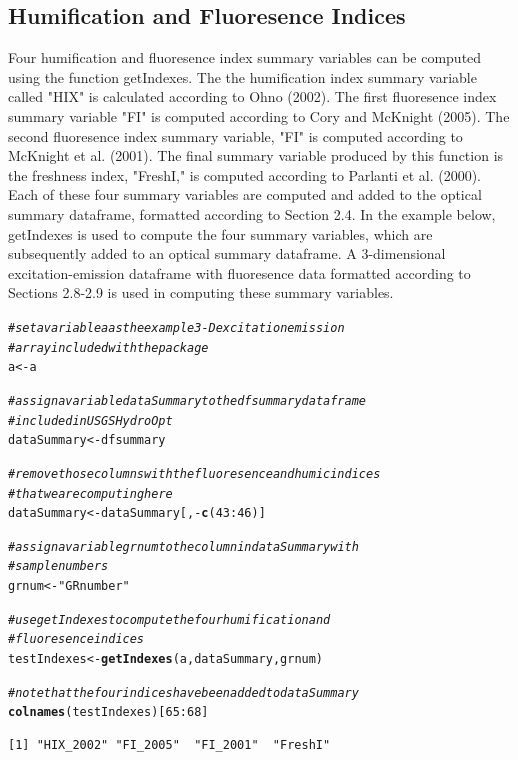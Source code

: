 \documentclass[a4paper,11pt]{article}\usepackage[]{graphicx}\usepackage[]{color}
\makeatletter
\newcommand{\hlnum}[1]{\textcolor[rgb]{0.686,0.059,0.569}{#1}}%
\newcommand{\hlstr}[1]{\textcolor[rgb]{0.192,0.494,0.8}{#1}}%
\newcommand{\hlcom}[1]{\textcolor[rgb]{0.678,0.584,0.686}{\textit{#1}}}%
\newcommand{\hlopt}[1]{\textcolor[rgb]{0,0,0}{#1}}%
\newcommand{\hlstd}[1]{\textcolor[rgb]{0.345,0.345,0.345}{#1}}%
\newcommand{\hlkwb}[1]{\textcolor[rgb]{0.69,0.353,0.396}{#1}}%
\newcommand{\hlkwd}[1]{\textcolor[rgb]{0.737,0.353,0.396}{\textbf{#1}}}%
\newenvironment{kframe}{%
 \def\at@end@of@kframe{}%
 \ifinner\ifhmode%
  \def\at@end@of@kframe{\end{minipage}}%
  \begin{minipage}{\columnwidth}%
 \fi\fi%
 \def\FrameCommand##1{\hskip\@totalleftmargin \hskip-\fboxsep
 \colorbox{shadecolor}{##1}\hskip-\fboxsep
     \hskip-\linewidth \hskip-\@totalleftmargin \hskip\columnwidth}%
 \MakeFramed {\advance\hsize-\width
   \@totalleftmargin\z@ \linewidth\hsize
   \@setminipage}}%
 {\par\unskip\endMakeFramed%
 \at@end@of@kframe}
\newenvironment{knitrout}{}{} %
\makeatother
\begin{document}
\subsection{Humification and Fluoresence Indices}
Four humification and fluoresence index summary variables can be computed using the function getIndexes. The the humification index summary variable called "HIX" is calculated according to Ohno (2002). The first fluoresence index summary variable "FI" is computed according to Cory and McKnight (2005). The second fluoresence index summary variable, "FI" is computed according to McKnight et al. (2001). The final summary variable produced by this function is the freshness index, "FreshI," is computed according to Parlanti et al. (2000). Each of these four summary variables are computed and added to the optical summary dataframe, formatted according to Section 2.4. In the example below, getIndexes is used to compute the four summary variables, which are subsequently added to an optical summary dataframe. A 3-dimensional excitation-emission dataframe with fluoresence data formatted according to Sections 2.8-2.9 is used in computing these summary variables.

\begin{knitrout}
\color{fgcolor}\begin{kframe}
\begin{alltt}
\hlcom{# set a variable a as the example 3-D excitation emission}
\hlcom{# array included with the package}
\hlstd{a} \hlkwb{<-} \hlstd{a}

\hlcom{# assign a variable dataSummary to the dfsummary dataframe}
\hlcom{# included in USGSHydroOpt}
\hlstd{dataSummary} \hlkwb{<-} \hlstd{dfsummary}

\hlcom{# remove those columns with the fluoresence and humic indices}
\hlcom{# that we are computing here}
\hlstd{dataSummary} \hlkwb{<-} \hlstd{dataSummary[,} \hlopt{-}\hlkwd{c}\hlstd{(}\hlnum{43}\hlopt{:}\hlnum{46}\hlstd{)]}

\hlcom{# assign a variable grnum to the column in dataSummary with}
\hlcom{# sample numbers}
\hlstd{grnum} \hlkwb{<-} \hlstr{"GRnumber"}

\hlcom{# use getIndexes to compute the four humification and}
\hlcom{# fluoresence indices}
\hlstd{testIndexes} \hlkwb{<-} \hlkwd{getIndexes}\hlstd{(a, dataSummary, grnum)}

\hlcom{# note that the four indices have been added to dataSummary}
\hlkwd{colnames}\hlstd{(testIndexes)[}\hlnum{65}\hlopt{:}\hlnum{68}\hlstd{]}
\end{alltt}
\begin{verbatim}
[1] "HIX_2002" "FI_2005"  "FI_2001"  "FreshI"  
\end{verbatim}
\end{kframe}
\end{knitrout}
\end{document}
